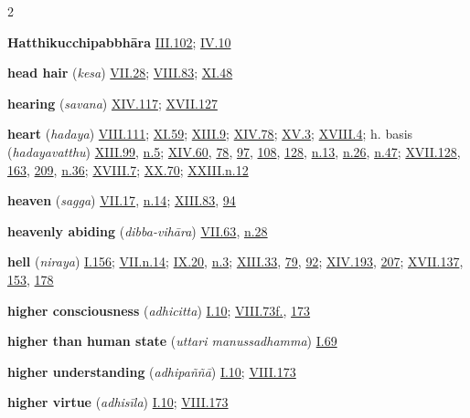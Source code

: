 \begin{multicols}{2}
\begin{vismHanging}
\par\textbf{Hatthikucchipabbhāra} \hyperlink{III.102}{III.102}{}; \hyperlink{IV.10}{IV.10}{}
\par\textbf{head hair} (\emph{kesa}) \hyperlink{VII.28}{VII.28}{}; \hyperlink{VIII.83}{VIII.83}{}; \hyperlink{XI.48}{XI.48}{}
\par\textbf{hearing} (\emph{savana}) \hyperlink{XIV.117}{XIV.117}{}; \hyperlink{XVII.127}{XVII.127}{}
\par\textbf{heart} (\emph{hadaya}) \hyperlink{VIII.111}{VIII.111}{}; \hyperlink{XI.59}{XI.59}{}; \hyperlink{XIII.9}{XIII.9}{}; \hyperlink{XIV.78}{XIV.78}{}; \hyperlink{XV.3}{XV.3}{}; \hyperlink{XVIII.4}{XVIII.4}{}; h. basis (\emph{hadayavatthu}) \hyperlink{XIII.99}{XIII.99}{}, \hyperlink{XIII.n5}{n.5}{}; \hyperlink{XIV.60}{XIV.60}{}, \hyperlink{XIV.78}{78}{}, \hyperlink{XIV.97}{97}{}, \hyperlink{XIV.108}{108}{}, \hyperlink{XIV.128}{128}{}, \hyperlink{XIV.n13}{n.13}{}, \hyperlink{XIV.n26}{n.26}{}, \hyperlink{XIV.n47}{n.47}{}; \hyperlink{XVII.128}{XVII.128}{}, \hyperlink{XVII.163}{163}{}, \hyperlink{XVII.209}{209}{}, \hyperlink{XVII.n36}{n.36}{}; \hyperlink{XVIII.7}{XVIII.7}{}; \hyperlink{XX.70}{XX.70}{}; \hyperlink{XXIII.n12}{XXIII.n.12}{}
\par\textbf{heaven} (\emph{sagga}) \hyperlink{VII.17}{VII.17}{}, \hyperlink{VII.n14}{n.14}{}; \hyperlink{XIII.83}{XIII.83}{}, \hyperlink{XIII.94}{94}{}
\par\textbf{heavenly abiding} (\emph{dibba-vihāra}) \hyperlink{VII.63}{VII.63}{}, \hyperlink{VII.n28}{n.28}{}
\par\textbf{hell} \emph{ }(\emph{niraya}) \hyperlink{I.156}{I.156}{}; \hyperlink{VII.n14}{VII.n.14}{}; \hyperlink{IX.20}{IX.20}{}, \hyperlink{IX.n3}{n.3}{}; \hyperlink{XIII.33}{XIII.33}{}, \hyperlink{XIII.79}{79}{}, \hyperlink{XIII.92}{92}{}; \hyperlink{XIV.193}{XIV.193}{}, \hyperlink{XIV.207}{207}{}; \hyperlink{XVII.137}{XVII.137}{}, \hyperlink{XVII.153}{153}{}, \hyperlink{XVII.178}{178}{}
\par\textbf{higher consciousness} (\emph{adhicitta}) \hyperlink{I.10}{I.10}{}; \hyperlink{VIII.73}{VIII.73f.}{}, \hyperlink{VIII.173}{173}{}
\par\textbf{higher than human state} (\emph{uttari manussadhamma}) \hyperlink{I.69}{I.69}{}
\par\textbf{higher understanding} (\emph{adhipaññā}) \hyperlink{I.10}{I.10}{}; \hyperlink{VIII.173}{VIII.173}{}
\par\textbf{higher virtue} (\emph{adhisīla}) \hyperlink{I.10}{I.10}{}; \hyperlink{VIII.173}{VIII.173}{}

\end{vismHanging}
\end{multicols}
